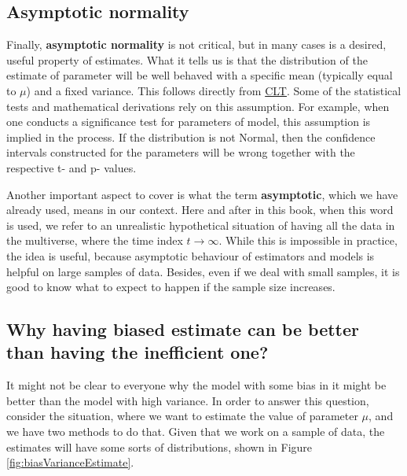 \documentclass[
]{book}
\theoremstyle{definition}
\theoremstyle{definition}
\theoremstyle{definition}
\theoremstyle{definition}
\theoremstyle{remark}
\begin{document}
\subsection{Asymptotic normality}\label{asymptoticNormality}

Finally, \textbf{asymptotic normality} is not critical, but in many cases is a desired, useful property of estimates. What it tells us is that the distribution of the estimate of parameter will be well behaved with a specific mean (typically equal to \(\mu\)) and a fixed variance. This follows directly from \hyperref[LLNandCLT]{CLT}. Some of the statistical tests and mathematical derivations rely on this assumption. For example, when one conducts a significance test for parameters of model, this assumption is implied in the process. If the distribution is not Normal, then the confidence intervals constructed for the parameters will be wrong together with the respective t- and p- values.

Another important aspect to cover is what the term \textbf{asymptotic}, which we have already used, means in our context. Here and after in this book, when this word is used, we refer to an unrealistic hypothetical situation of having all the data in the multiverse, where the time index \(t \rightarrow \infty\). While this is impossible in practice, the idea is useful, because asymptotic behaviour of estimators and models is helpful on large samples of data. Besides, even if we deal with small samples, it is good to know what to expect to happen if the sample size increases.

\subsection{Why having biased estimate can be better than having the inefficient one?}\label{efficiencyVSBias}

It might not be clear to everyone why the model with some bias in it might be better than the model with high variance. In order to answer this question, consider the situation, where we want to estimate the value of parameter \(\mu\), and we have two methods to do that. Given that we work on a sample of data, the estimates will have some sorts of distributions, shown in Figure \ref{fig:biasVarianceEstimate}.
\end{document}
